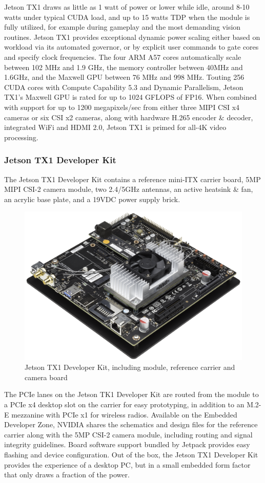             Jetson TX1 draws as little as 1 watt of power or lower while idle, around 8-10 watts under typical CUDA load, and up to 15 watts TDP when the module is fully utilized, for example during gameplay and the most demanding vision routines. 
            Jetson TX1 provides exceptional dynamic power scaling either based on workload via its automated governor, or by explicit user commands to gate cores and specify clock frequencies. The four ARM A57 cores automatically scale between 102 MHz 
            and 1.9 GHz, the memory controller between 40MHz and 1.6GHz, and the Maxwell GPU between 76 MHz and 998 MHz. Touting 256 CUDA cores with Compute Capability 5.3 and Dynamic Parallelism, Jetson TX1’s Maxwell GPU is rated for up to 1024 GFLOPS 
            of FP16. When combined with support for up to 1200 megapixels/sec from either three MIPI CSI x4 cameras or six CSI x2 cameras, along with hardware H.265 encoder \& decoder, integrated WiFi and HDMI 2.0, Jetson TX1 is primed for all-4K video processing.
        \subsubsection{Jetson TX1 Developer Kit}
            The Jetson TX1 Developer Kit contains a reference mini-ITX carrier board, 5MP MIPI CSI-2 camera module, two 2.4/5GHz antennas, an active heatsink \& fan, an acrylic base plate, and a 19VDC power supply brick.
            \begin{figure}[H]
                \centering
                \includegraphics[width=0.6\linewidth]{img/tx1-dev-kit.png}
                \caption{Jetson TX1 Developer Kit, including module, reference carrier and camera board}
            \end{figure}
            The PCIe lanes on the Jetson TK1 Developer Kit are routed from the module to a PCIe x4 desktop slot on the carrier for easy prototyping, in addition to an M.2-E mezzanine with PCIe x1 for wireless radios. Available on the Embedded Developer Zone, 
            NVIDIA shares the schematics and design files for the reference carrier along with the 5MP CSI-2 camera module, including routing and signal integrity guidelines. Board software support bundled by Jetpack provides easy flashing and device configuration. 
            Out of the box, the Jetson TX1 Developer Kit provides the experience of a desktop PC, but in a small embedded form factor that only draws a fraction of the power.
